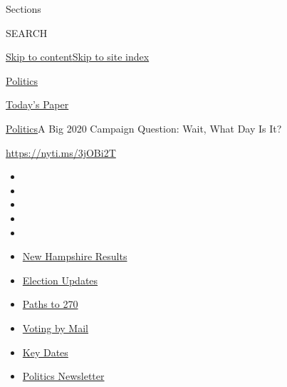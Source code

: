 Sections

SEARCH

\protect\hyperlink{site-content}{Skip to
content}\protect\hyperlink{site-index}{Skip to site index}

\href{https://www.nytimes3xbfgragh.onion/section/politics}{Politics}

\href{https://myaccount.nytimes3xbfgragh.onion/auth/login?response_type=cookie\&client_id=vi}{}

\href{https://www.nytimes3xbfgragh.onion/section/todayspaper}{Today's
Paper}

\href{/section/politics}{Politics}\textbar{}A Big 2020 Campaign
Question: Wait, What Day Is It?

\url{https://nyti.ms/3jOBi2T}

\begin{itemize}
\item
\item
\item
\item
\item
\end{itemize}

\begin{itemize}
\item
  \href{https://www.nytimes3xbfgragh.onion/interactive/2020/09/08/us/elections/results-new-hampshire-primary-elections.html?action=click\&pgtype=Article\&state=default\&region=TOP_BANNER\&context=storylines_menu}{New
  Hampshire Results}
\item
  \href{https://www.nytimes3xbfgragh.onion/live/2020/09/08/us/trump-vs-biden?action=click\&pgtype=Article\&state=default\&region=TOP_BANNER\&context=storylines_menu}{Election
  Updates}
\item
  \href{https://www.nytimes3xbfgragh.onion/interactive/2020/us/elections/election-states-biden-trump.html?action=click\&pgtype=Article\&state=default\&region=TOP_BANNER\&context=storylines_menu}{Paths
  to 270}
\item
  \href{https://www.nytimes3xbfgragh.onion/interactive/2020/08/31/us/politics/vote-by-mail-deadlines.html?action=click\&pgtype=Article\&state=default\&region=TOP_BANNER\&context=storylines_menu}{Voting
  by Mail}
\item
  \href{https://www.nytimes3xbfgragh.onion/interactive/2019/us/elections/2020-presidential-election-calendar.html?action=click\&pgtype=Article\&state=default\&region=TOP_BANNER\&context=storylines_menu}{Key
  Dates}
\item
  \href{https://www.nytimes3xbfgragh.onion/newsletters/politics?action=click\&pgtype=Article\&state=default\&region=TOP_BANNER\&context=storylines_menu}{Politics
  Newsletter}
\end{itemize}

